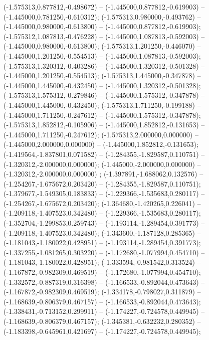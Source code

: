  (-1.575313,0.877812,-0.498672) -- (-1.445000,0.877812,-0.619903) -- (-1.445000,0.781250,-0.610312);
 (-1.575313,0.980000,-0.493762) -- (-1.445000,0.980000,-0.613800) -- (-1.445000,0.877812,-0.619903);
 (-1.575312,1.087813,-0.476228) -- (-1.445000,1.087813,-0.592003) -- (-1.445000,0.980000,-0.613800);
 (-1.575313,1.201250,-0.446070) -- (-1.445000,1.201250,-0.554513) -- (-1.445000,1.087813,-0.592003);
 (-1.575313,1.320312,-0.403286) -- (-1.445000,1.320312,-0.501328) -- (-1.445000,1.201250,-0.554513);
 (-1.575313,1.445000,-0.347878) -- (-1.445000,1.445000,-0.432450) -- (-1.445000,1.320312,-0.501328);
 (-1.575313,1.575312,-0.279846) -- (-1.445000,1.575312,-0.347878) -- (-1.445000,1.445000,-0.432450);
 (-1.575313,1.711250,-0.199188) -- (-1.445000,1.711250,-0.247612) -- (-1.445000,1.575312,-0.347878);
 (-1.575313,1.852812,-0.105906) -- (-1.445000,1.852812,-0.131653) -- (-1.445000,1.711250,-0.247612);
 (-1.575313,2.000000,0.000000) -- (-1.445000,2.000000,0.000000) -- (-1.445000,1.852812,-0.131653);
 (-1.419564,-1.837801,0.071582) -- (-1.284355,-1.829587,0.110751) -- (-1.320312,-2.000000,0.000000);
 (-1.445000,-2.000000,0.000000) -- (-1.320312,-2.000000,0.000000) ;
 (-1.397891,-1.688062,0.132576) -- (-1.254267,-1.675672,0.203420) -- (-1.284355,-1.829587,0.110751);
 (-1.379677,-1.549305,0.183833) -- (-1.229366,-1.535683,0.280117) -- (-1.254267,-1.675672,0.203420);
 (-1.364680,-1.420265,0.226041) -- (-1.209118,-1.407523,0.342480) -- (-1.229366,-1.535683,0.280117);
 (-1.352704,-1.299853,0.259743) -- (-1.193114,-1.289454,0.391773) -- (-1.209118,-1.407523,0.342480);
 (-1.343600,-1.187128,0.285365) -- (-1.181043,-1.180022,0.428951) -- (-1.193114,-1.289454,0.391773);
 (-1.337255,-1.081265,0.303220) -- (-1.172680,-1.077994,0.454710) -- (-1.181043,-1.180022,0.428951);
 (-1.333594,-0.981542,0.313524) -- (-1.167872,-0.982309,0.469519) -- (-1.172680,-1.077994,0.454710);
 (-1.332572,-0.887319,0.316398) -- (-1.166533,-0.892044,0.473643) -- (-1.167872,-0.982309,0.469519);
 (-1.334178,-0.798027,0.311879) -- (-1.168639,-0.806379,0.467157) -- (-1.166533,-0.892044,0.473643);
 (-1.338431,-0.713152,0.299911) -- (-1.174227,-0.724578,0.449945) -- (-1.168639,-0.806379,0.467157);
 (-1.345381,-0.632232,0.280352) -- (-1.183398,-0.645961,0.421697) -- (-1.174227,-0.724578,0.449945);
